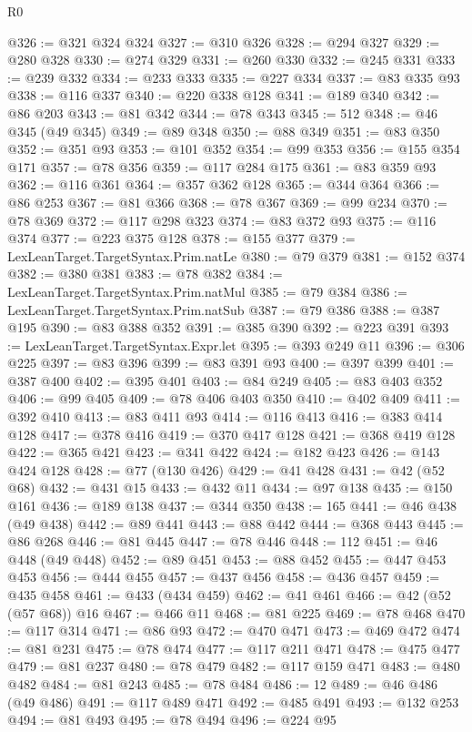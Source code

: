 \begin{lexlean}{R0}
\begin{coremodule}
@326 := @321 @324 @324
@327 := @310 @326
@328 := @294 @327
@329 := @280 @328
@330 := @274 @329
@331 := @260 @330
@332 := @245 @331
@333 := @239 @332
@334 := @233 @333
@335 := @227 @334
@337 := @83 @335 @93
@338 := @116 @337
@340 := @220 @338 @128
@341 := @189 @340
@342 := @86 @203
@343 := @81 @342
@344 := @78 @343
@345 := 512
@348 := @46 @345 (@49 @345)
@349 := @89 @348
@350 := @88 @349
@351 := @83 @350
@352 := @351 @93
@353 := @101 @352
@354 := @99 @353
@356 := @155 @354 @171
@357 := @78 @356
@359 := @117 @284 @175
@361 := @83 @359 @93
@362 := @116 @361
@364 := @357 @362 @128
@365 := @344 @364
@366 := @86 @253
@367 := @81 @366
@368 := @78 @367
@369 := @99 @234
@370 := @78 @369
@372 := @117 @298 @323
@374 := @83 @372 @93
@375 := @116 @374
@377 := @223 @375 @128
@378 := @155 @377
@379 := LexLeanTarget.TargetSyntax.Prim.natLe
@380 := @79 @379
@381 := @152 @374
@382 := @380 @381
@383 := @78 @382
@384 := LexLeanTarget.TargetSyntax.Prim.natMul
@385 := @79 @384
@386 := LexLeanTarget.TargetSyntax.Prim.natSub
@387 := @79 @386
@388 := @387 @195
@390 := @83 @388 @352
@391 := @385 @390
@392 := @223 @391
@393 := LexLeanTarget.TargetSyntax.Expr.let
@395 := @393 @249 @11
@396 := @306 @225
@397 := @83 @396
@399 := @83 @391 @93
@400 := @397 @399
@401 := @387 @400
@402 := @395 @401
@403 := @84 @249
@405 := @83 @403 @352
@406 := @99 @405
@409 := @78 @406 @403 @350
@410 := @402 @409
@411 := @392 @410
@413 := @83 @411 @93
@414 := @116 @413
@416 := @383 @414 @128
@417 := @378 @416
@419 := @370 @417 @128
@421 := @368 @419 @128
@422 := @365 @421
@423 := @341 @422
@424 := @182 @423
@426 := @143 @424 @128
@428 := @77 (@130 @426)
@429 := @41 @428
@431 := @42 (@52 @68)
@432 := @431 @15
@433 := @432 @11
@434 := @97 @138
@435 := @150 @161
@436 := @189 @138
@437 := @344 @350
@438 := 165
@441 := @46 @438 (@49 @438)
@442 := @89 @441
@443 := @88 @442
@444 := @368 @443
@445 := @86 @268
@446 := @81 @445
@447 := @78 @446
@448 := 112
@451 := @46 @448 (@49 @448)
@452 := @89 @451
@453 := @88 @452
@455 := @447 @453 @453
@456 := @444 @455
@457 := @437 @456
@458 := @436 @457
@459 := @435 @458
@461 := @433 (@434 @459)
@462 := @41 @461
@466 := @42 (@52 (@57 @68)) @16
@467 := @466 @11
@468 := @81 @225
@469 := @78 @468
@470 := @117 @314
@471 := @86 @93
@472 := @470 @471
@473 := @469 @472
@474 := @81 @231
@475 := @78 @474
@477 := @117 @211 @471
@478 := @475 @477
@479 := @81 @237
@480 := @78 @479
@482 := @117 @159 @471
@483 := @480 @482
@484 := @81 @243
@485 := @78 @484
@486 := 12
@489 := @46 @486 (@49 @486)
@491 := @117 @489 @471
@492 := @485 @491
@493 := @132 @253
@494 := @81 @493
@495 := @78 @494
@496 := @224 @95

\end{coremodule}
\end{lexlean}
